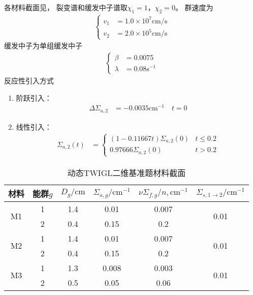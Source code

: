 各材料截面见，
裂变谱和缓发中子谱取$\chi_1=1$，$\chi_2=0$。
群速度为
\begin{align}
  \left\{
  \begin{aligned}
  v_1&=1.0\times10^7\mathrm{cm/s}\\
  v_2&=2.0\times10^5\mathrm{cm/s}
  \end{aligned}
  \right.
\end{align}
缓发中子为单组缓发中子
\begin{align}
  \left\{
  \begin{aligned}
  \beta&=0.0075\\
  \lambda&=0.08\mathrm{s}^{-1}
  \end{aligned}
  \right.
\end{align}
反应性引入方式
\begin{enumerate}
\item 阶跃引入：
\begin{align}
\Delta\Sigma_{a,2}&=-0.0035\mathrm{cm}^{-1} \quad t=0
\end{align}

\item 线性引入：
\begin{align}
\Sigma_{a,2}(t)&=\begin{cases}
    (1-0.11667t)\Sigma_{a,2}(0) & t\le 0.2\\
    0.97666\Sigma_{a,2}(0) & t > 0.2
  \end{cases}
\end{align}


\end{enumerate}

\begin{table}
\centering
\caption{\label{tab:result.test.twigl.mat}动态TWIGL二维基准题材料截面}
\begin{tabular}{cccccc}
\toprule
材料 & 能群$g$ & $D_g/\mathrm{cm}$ & $\Sigma_{a,g}/\mathrm{cm}^{-1}$
    & $\nu\Sigma_{f,g}/n,\mathrm{cm}^{-1}$
    & $\Sigma_{s,1\rightarrow2}/\mathrm{cm}^{-1}$\\
\midrule
\multirow{2}{*}{M1} 
  & 1 & 1.4 & 0.01 & 0.007 & \multirow{2}{*}{0.01} \\
  & 2 & 0.4 & 0.15 & 0.2 &\\
\multirow{2}{*}{M2} 
  & 1 & 1.4 & 0.01 & 0.007 & \multirow{2}{*}{0.01} \\
  & 2 & 0.4 & 0.15 & 0.2 &\\
\multirow{2}{*}{M3} 
  & 1 & 1.3 & 0.008 & 0.003 & \multirow{2}{*}{0.01} \\
  & 2 & 0.5 & 0.05 & 0.06 &\\
\bottomrule
\end{tabular}
\end{table}

